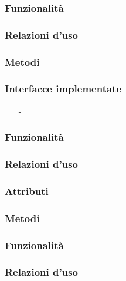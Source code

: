 
\subsubsection*{Funzionalità}

\subsubsection*{Relazioni d'uso}

\subsubsection*{Metodi}


\subsubsection*{Interfacce implementate}
\begin{itemize}[noitemsep,nolistsep]
  \item[-] 
\end{itemize}

\subsubsection*{Funzionalità}

\subsubsection*{Relazioni d'uso}

\subsubsection*{Attributi}

\subsubsection*{Metodi}


\subsubsection*{Funzionalità}

\subsubsection*{Relazioni d'uso}

